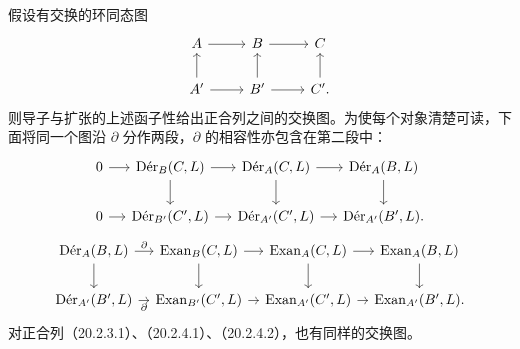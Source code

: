 假设有交换的环同态图
\[
\begin{tikzcd}
 A\arrow[r]&B\arrow[r]&C\\
 A'\arrow[u]\arrow[r]&B'\arrow[u]\arrow[r]&C'\arrow[u].
\end{tikzcd}
\]
则导子与扩张的上述函子性给出正合列之间的交换图。为使每个对象清楚可读，下面将同一个图沿 $\partial$ 分作两段，$\partial$ 的相容性亦包含在第二段中：
\[
\begin{tikzcd}[column sep=1.2em]
0\arrow[r]&\Der_B(C,L)\arrow[r]\arrow[d]&\Der_A(C,L)\arrow[r]\arrow[d]&\Der_A(B,L)\arrow[d]\\
0\arrow[r]&\Der_{B'}(C',L)\arrow[r]&\Der_{A'}(C',L)\arrow[r]&\Der_{A'}(B',L).
\end{tikzcd}
\]
\[
\begin{tikzcd}[column sep=.8em]
\Der_A(B,L)\arrow[r,"\partial"]\arrow[d]&\Exan_B(C,L)\arrow[r]\arrow[d]&\Exan_A(C,L)\arrow[r]\arrow[d]&\Exan_A(B,L)\arrow[d]\\
\Der_{A'}(B',L)\arrow[r,"\partial"']&\Exan_{B'}(C',L)\arrow[r]&\Exan_{A'}(C',L)\arrow[r]&\Exan_{A'}(B',L).
\end{tikzcd}
\]
对正合列（20.2.3.1）、（20.2.4.1）、（20.2.4.2），也有同样的交换图。
